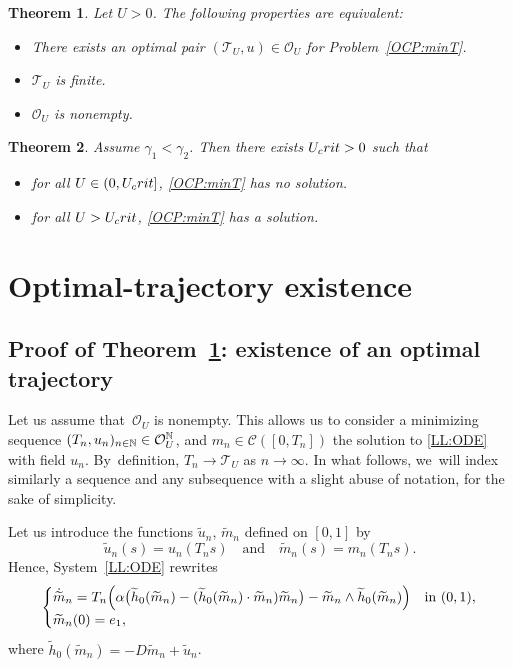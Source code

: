 \documentclass[10pt]{amsart}
\let\Subsection\subsection
\newtheorem{theorem}{Theorem}
\theoremstyle{definition}
\newcommand{\N} {\mathbb{N}}
\begin{document}
\begin{theorem} \label{th:ex_min}
Let $U > 0$. The following properties are equivalent:
\begin{itemize}
\item[(i)] There exists an optimal pair $(\mathcal{T}_{U}, u) \in \mathcal{O}_{U }$ for Problem~\eqref{OCP:minT}.
\item[(ii)] $\mathcal{T}_{U}$ is finite.
\item[(iii)] $\mathcal{O}_{U }$ is nonempty.
\end{itemize}
\end{theorem}

\begin{theorem} \label{th:ex_U_crit}
Assume $\gamma_1 < \gamma_2$. Then there exists $U_\textnormal{crit} > 0$ such that
\begin{itemize}
\item for all $U \in (0, U_\textnormal{crit}]$, \eqref{OCP:minT} has no solution.
\item for all $U > U_\textnormal{crit}$, \eqref{OCP:minT} has a solution.
\end{itemize}
\end{theorem}

\section{Optimal-trajectory existence}
\Subsection{Proof of Theorem~\ref{th:ex_min}: existence of an optimal trajectory}

Let us assume that~$\mathcal{O}_{U }$ is nonempty. This allows us to consider a minimizing \hbox{sequence} $(T_n,u_n)_{n\in\N}\in\nobreak \mathcal{O}_{U }^\N$, and $m_n \in \mathscr{C}([0,T_n])$ the solution to \eqref{LL:ODE} with field $u_n$.
By~definition, $T_n \to \mathcal{T}_U$ as $n \to \infty$.
In what follows, we~will index similarly a sequence and any subsequence with a slight abuse of notation, for the sake of simplicity.

Let us introduce the functions $\widetilde{u}_n$, $\widetilde{m}_{n}$ defined on $[0,1]$ by
\[
\widetilde{u}_n(s)=u_n(T_ns)\quad \text{and}\quad \widetilde{m}_{n}(s)=m_{n}(T_ns).
\]
Hence, System~\eqref{LL:ODE} rewrites
\begin{equation}\label{LL:ODEbis}
\begin{cases}
\dot{\widetilde{m}}_n = T_n \Bigl(\alpha \bigl(\widetilde{h}_0(\widetilde{m}_n)-(\widetilde{h}_0(\widetilde{m}_n)\cdot \widetilde{m}_n) \widetilde{m}_n\bigr)-\widetilde{m}_n\wedge \widetilde{h}_0(\widetilde{m}_n)\Bigr)& \text{in }(0,1), \\
\widetilde{m}_n(0) =e_1,
\end{cases}
\end{equation}
where $\widetilde{h}_0(\widetilde{m}_n)=-D\widetilde{m}_{n}+\widetilde{u}_n$.
\end{document}
